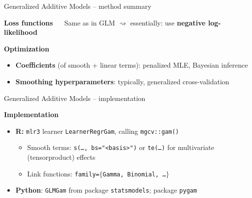 \documentclass[11pt,compress,t,notes=noshow, xcolor=table]{beamer}
\newcommand{\highlight}[1]{\textcolor{hlcol}{\textbf{#1}}}
\begin{document}
\begin{frame2}{Generalized Additive Models -- method summary}

\highlight{Loss functions} ~~ Same as in GLM $\rightsquigarrow$ essentially:
use \textbf{negative log-likelihood}

\highlight{Optimization}
\begin{itemize}
  \item \textbf{Coefficients} (of smooth + linear terms):
  penalized MLE, Bayesian inference
  \item \textbf{Smoothing hyperparameters}: typically, generalized
  cross-validation
\end{itemize}

\end{frame2}


\begin{frame2}{Generalized Additive Models -- implementation}

  \highlight{Implementation}

\begin{itemize}
  \item \textbf{R:} \texttt{mlr3} learner \texttt{LearnerRegrGam},
    calling \texttt{mgcv::gam()}
  \begin{itemize}
      \item Smooth terms: \texttt{s(\dots, bs="<basis>")} or \texttt{te(\dots)}
      for multivariate (tensorproduct) effects
      \item Link functions: \texttt{family=$\{$Gamma, Binomial, \dots $\}$}
  \end{itemize}
    \item \textbf{Python}: \texttt{GLMGam} from package \texttt{statsmodels};
    package \texttt{pygam}
\end{itemize}

\end{frame2}
\end{document}
